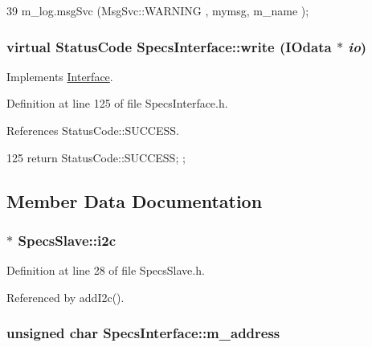 \begin{DoxyCode}
39 { m_log.msgSvc (MsgSvc::WARNING , mymsg, m_name ); }
\end{DoxyCode}
\hypertarget{classSpecsInterface_a33c7224b61bbb8d1ef20680f570ba4bd}{
\subsubsection[{write}]{\setlength{\rightskip}{0pt plus 5cm}virtual {\bf StatusCode} SpecsInterface::write ({\bf IOdata} $\ast$ {\em io})}}
\label{classSpecsInterface_a33c7224b61bbb8d1ef20680f570ba4bd}


Implements \hyperlink{classInterface_ad665cacbaf490a26c1c4ba192022e68a}{Interface}.

Definition at line 125 of file SpecsInterface.h.

References StatusCode::SUCCESS.


\begin{DoxyCode}
125 { return StatusCode::SUCCESS; };
\end{DoxyCode}


\subsection{Member Data Documentation}
\hypertarget{classSpecsSlave_a5210e5a45c381ee29a830b42119ec1d3}{
\subsubsection[{i2c}]{$\ast$ {\bf SpecsSlave::i2c}}}
\label{classSpecsSlave_a5210e5a45c381ee29a830b42119ec1d3}


Definition at line 28 of file SpecsSlave.h.

Referenced by addI2c().\hypertarget{classSpecsInterface_a4064da5ca6e0a172363967c4acc0b365}{
\subsubsection[{m\_\-address}]{\setlength{\rightskip}{0pt plus 5cm}unsigned char {\bf SpecsInterface::m\_\-address}}}
\label{classSpecsInterface_a4064da5ca6e0a172363967c4acc0b365}


